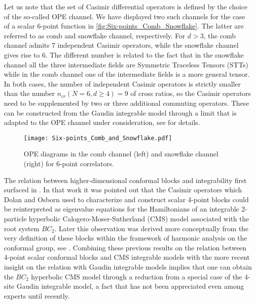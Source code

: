 \documentclass{article}
\begin{document}
Let us note that the set of Casimir differential operators is defined by the choice 
of the so-called OPE channel. We have 
displayed two such channels for the case of a scalar 6-point function in 
\autoref{fig:Six-points_Comb_Snowflake}. The latter are referred to as comb and snowflake channel, 
respectively. For $d>3$, the comb channel admits $7$ independent Casimir operators, 
while the snowflake channel gives rise to $6$. The different number is related to 
the fact that in the snowflake channel all the three intermediate fields are 
Symmetric Traceless Tensors (STTs) while in the comb channel one of the intermediate 
fields is a more general tensor. In both cases, the number of independent Casimir 
operators is strictly smaller than the number $n_\textit{cr}(N=6,d\geq 4) = 9$ of 
cross ratios, so the Casimir operators need to be supplemented by two or three 
additional commuting operators. These can be constructed from the Gaudin integrable 
model through a limit that is adapted to the OPE channel under consideration, see 
\cite{Buric:2021ywo} for details. 

\begin{figure}[htp]
    \centering
    \texttt{[image: Six-points\_Comb\_and\_Snowflake.pdf]}
    \caption{OPE diagrams in the comb channel (left) and snowflake channel (right) for 6-point correlators.}
    \label{fig:Six-points_Comb_Snowflake}
\end{figure}

The relation between higher-dimensional conformal blocks and integrability first 
surfaced in \cite{Isachenkov:2016gim}. In that work it was pointed out that the 
Casimir operators which Dolan and Osborn used to characterize and construct scalar 
4-point blocks could be reinterpreted as eigenvalue equations for the Hamiltonians
of an integrable 2-particle hyperbolic Calogero-Moser-Sutherland (CMS) model associated with 
the root system $BC_2$. Later this observation was derived more conceptually from the 
very definition of these blocks within the framework of harmonic analysis on the 
conformal group, see \cite{Schomerus:2016epl,Schomerus:2017eny,Isachenkov:2018pef}.
Combining these previous results on the relation between 4-point scalar conformal 
blocks and CMS integrable models with the more recent insight on 
the relation with Gaudin integrable models implies that one can obtain the $BC_2$ hyperbolic 
CMS model through a reduction from a special case of the 4-site 
Gaudin integrable model, a fact that has not been appreciated even among experts 
until recently. 
\end{document}
